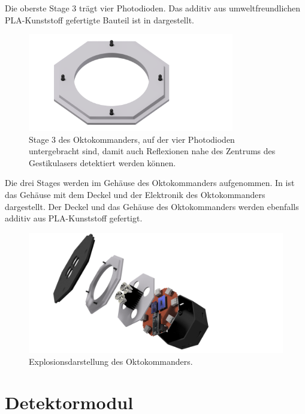 \newpage
\noindent
Die oberste Stage 3 trägt vier Photodioden. Das additiv aus umweltfreundlichen PLA-Kunststoff gefertigte Bauteil ist in  dargestellt.
\begin{figure}[H]
	\centering
	\includegraphics[width=9cm]{../CAD_Bilder/OktagonElektronik_Stage3_raytraced.png}
	\caption{Stage 3 des Oktokommanders, auf der vier Photodioden untergebracht sind, damit auch Reflexionen nahe des Zentrums des Gestikulasers detektiert werden können.}
	\label{fig:OktoStage3}
\end{figure}
\noindent
Die drei Stages werden im Gehäuse des Oktokommanders aufgenommen. In  ist das Gehäuse mit dem Deckel und der Elektronik des Oktokommanders dargestellt. Der Deckel und das Gehäuse des Oktokommanders werden ebenfalls additiv aus PLA-Kunststoff gefertigt.
\begin{figure}[H]
	\centering
	\includegraphics[width=12cm]{../CAD_Bilder/Oktokommander_raytraced.png}
	\caption{Explosionsdarstellung des Oktokommanders.}
	\label{fig:OktoZusammenbau}
\end{figure}




\section{Detektormodul}
\label{sec:Detektormodul}

